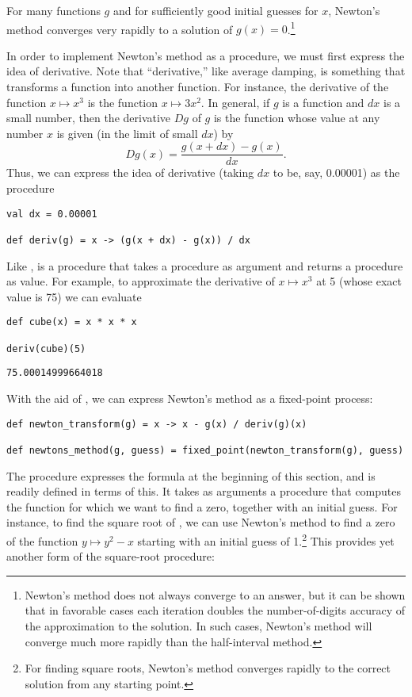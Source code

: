 For many functions $g$ and for sufficiently good initial guesses for $x$, Newton's method converges very rapidly to a solution of $g(x) = 0$.\footnote{Newton's method does not always converge to an answer, but it can be shown that in favorable cases each iteration doubles the number-of-digits accuracy of the approximation to the solution. In such cases, Newton's method will converge much more rapidly than the half-interval method.}

In order to implement Newton's method as a procedure, we must first express the idea of derivative. Note that ``derivative,'' like average damping, is something that transforms a function into another function. For instance, the derivative of the function $x \mapsto x^3$ is the function $x \mapsto 3x^2$. In general, if $g$ is a function and $dx$ is a small number, then the derivative $Dg$ of $g$ is the function whose value at any number $x$ is given (in the limit of small $dx$) by
\[
Dg(x) = \frac{g(x + dx) - g(x)}{dx}.
\]
Thus, we can express the idea of derivative (taking $dx$ to be, say, 0.00001) as the procedure

\begin{lstlisting}[style=slate]
val dx = 0.00001

def deriv(g) = x -> (g(x + dx) - g(x)) / dx
\end{lstlisting}

Like ,  is a procedure that takes a procedure as argument and returns a procedure as value. For example, to approximate the derivative of $x \mapsto x^3$ at 5 (whose exact value is 75) we can evaluate

\begin{lstlisting}[style=slate]
def cube(x) = x * x * x

deriv(cube)(5)
\end{lstlisting}
\begin{verbatim}
75.00014999664018
\end{verbatim}

With the aid of , we can express Newton's method as a fixed-point process:

\begin{lstlisting}[style=slate]
def newton_transform(g) = x -> x - g(x) / deriv(g)(x)

def newtons_method(g, guess) = fixed_point(newton_transform(g), guess)
\end{lstlisting}

The  procedure expresses the formula at the beginning of this section, and  is readily defined in terms of this. It takes as arguments a procedure that computes the function for which we want to find a zero, together with an initial guess. For instance, to find the square root of , we can use Newton's method to find a zero of the function $y \mapsto y^2 - x$ starting with an initial guess of 1.\footnote{For finding square roots, Newton's method converges rapidly to the correct solution from any starting point.} This provides yet another form of the square-root procedure:

